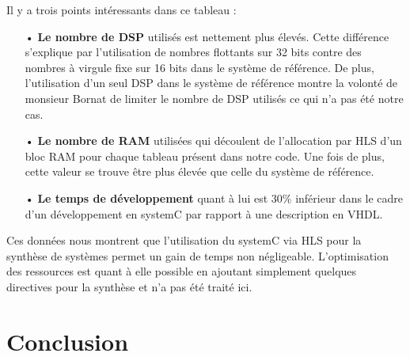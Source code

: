 \documentclass[a4paper,12pt]{article}
\begin{document}
	Il y a trois points intéressants dans ce tableau :
\begin{itemize}
	\item[•] \textbf{Le nombre de DSP} utilisés est nettement plus élevés. Cette différence s'explique par l'utilisation de nombres flottants sur 32 bits contre des nombres à virgule fixe sur 16 bits dans le système de référence. De plus, l'utilisation d'un seul DSP dans le système de référence montre la volonté de monsieur Bornat de limiter le nombre de DSP utilisés ce qui n'a pas été notre cas.
	\item[•] \textbf{Le nombre de RAM} utilisées qui découlent de l'allocation par HLS d'un bloc RAM pour chaque tableau présent dans notre code. Une fois de plus, cette valeur se trouve être plus élevée que celle du système de référence.
	\item[•] \textbf{Le temps de développement} quant à lui est $30\%$ inférieur dans le cadre d'un développement en systemC par rapport à une description en VHDL.
\end{itemize}
Ces données nous montrent que l'utilisation du systemC via HLS pour la synthèse de systèmes permet un gain de temps non négligeable. L'optimisation des ressources est quant à elle possible en ajoutant simplement quelques directives pour la synthèse et n'a pas été traité ici. 
\newpage
\section{Conclusion}
\end{document}
